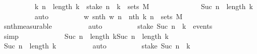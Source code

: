 \begin{isabellebody}
\ \ \ \ \ \ \ \ \isamarkupfalse%
\ {\isacartoucheopen}{\isasymAnd}k{}{\isachardot}{\kern0pt}\ n\ {\isasymle}\ length\ k{}\ {\isasymLongrightarrow}\ {\isacharparenleft}{\kern0pt}stake\ n\ {\isacharminus}{\kern0pt}{\isacharbackquote}{\kern0pt}\ {\isacharbraceleft}{\kern0pt}k{}{\isacharbraceright}{\kern0pt}{\isacharparenright}{\kern0pt}\ {\isasymin}\ sets\ M{\isacartoucheclose}\isanewline
\ \ \ \ \ \ \ \ \ \ \ \ \ \ {\isacartoucheopen}Suc\ n\ {\isacharequal}{\kern0pt}\ length\ k{\isacartoucheclose}\isanewline
\ \ \ \ \ \ \ \ \isamarkupfalse%
\ auto\isanewline
\ \ \ \ \ \ \isamarkupfalse%
\ \isamarkupfalse%
\ {\isachardoublequoteopen}{\isacharparenleft}{\kern0pt}{\isacharparenleft}{\kern0pt}{\isasymlambda}w{\isachardot}{\kern0pt}\ snth\ w\ n{\isacharparenright}{\kern0pt}\ {\isacharminus}{\kern0pt}{\isacharbackquote}{\kern0pt}\ {\isacharbraceleft}{\kern0pt}nth\ k\ n{\isacharbraceright}{\kern0pt}{\isacharparenright}{\kern0pt}\ {\isasymin}\ sets\ M\ {\isachardoublequoteclose}\isanewline
\ \ \ \ \ \ \ \ \isamarkupfalse%
\ snth{\isacharunderscore}{\kern0pt}measurable\isanewline
\ \ \ \ \ \ \ \ \isamarkupfalse%
\ auto\isanewline
\ \ \ \ \ \ \isamarkupfalse%
\ \isamarkupfalse%
\ {\isachardoublequoteopen}stake\ {\isacharparenleft}{\kern0pt}Suc\ n{\isacharparenright}{\kern0pt}\ {\isacharminus}{\kern0pt}{\isacharbackquote}{\kern0pt}\ {\isacharbraceleft}{\kern0pt}k{\isacharbraceright}{\kern0pt}\ {\isasymin}\ events{\isachardoublequoteclose}\isanewline
\ \ \ \ \ \ \ \ \isamarkupfalse%
\ simp\isanewline
\ \ \ \ \isamarkupfalse%
\isanewline
\ \ \ \ \ \ \isamarkupfalse%
\ {\isachardoublequoteopen}Suc\ n\ {\isasymle}\ length\ k{\isachardoublequoteclose}{\isachardoublequoteopen}Suc\ n\ {\isasymnoteq}\ length\ k{\isachardoublequoteclose}\isanewline
\ \ \ \ \ \ \isamarkupfalse%
\ \isamarkupfalse%
\ {\isachardoublequoteopen}Suc\ n\ {\isacharless}{\kern0pt}\ length\ k{\isachardoublequoteclose}\isanewline
\ \ \ \ \ \ \ \ \isamarkupfalse%
\ auto\isanewline
\ \ \ \ \ \ \isamarkupfalse%
\ \isamarkupfalse%
\ {\isachardoublequoteopen}stake\ {\isacharparenleft}{\kern0pt}Suc\ n{\isacharparenright}{\kern0pt}\ {\isacharminus}{\kern0pt}{\isacharbackquote}{\kern0pt}\ {\isacharbraceleft}{\kern0pt}k{\isacharbraceright}{\kern0pt}\ {\isacharequal}{\kern0pt}\ {\isacharbraceleft}{\kern0pt}{\isacharbraceright}{\kern0pt}{\isachardoublequoteclose}\isanewline

\end{isabellebody}
